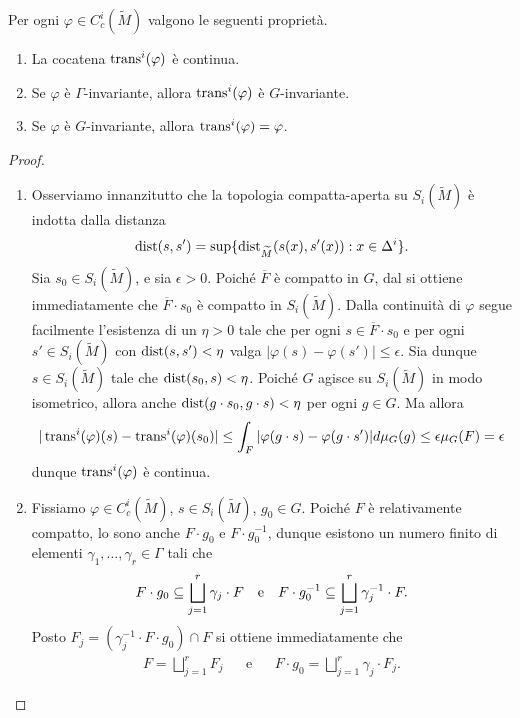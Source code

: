 \begin{proposition}
Per ogni $\varphi\in C^i_c(\widetilde M)$ valgono le seguenti proprietà.
\begin{enumerate}
\item La cocatena $\operatorname{trans}^i(\varphi)$ è continua.
\item Se $\varphi$ è $\Gamma$-invariante, allora $\operatorname{trans}^i(\varphi)$ è $G$-invariante.
\item Se $\varphi$ è $G$-invariante, allora $\operatorname{trans}^i(\varphi)=\varphi$.
\end{enumerate}
\end{proposition}
\begin{proof}\leavevmode
\begin{enumerate}
\item Osserviamo innanzitutto che la topologia compatta-aperta su $S_i(\widetilde M)$ è indotta dalla distanza
\[
\operatorname{dist}(s,s')=\sup\{\operatorname{dist}_{\widetilde M}(s(x),s'(x)):x\in\Delta^i\}.
\]
Sia $s_0\in S_i(\widetilde M)$, e sia $\epsilon>0$. Poiché $\overline{F}$ è compatto in $G$, dal  si ottiene immediatamente che $\overline{F}\cdot s_0$ è compatto in $S_i(\widetilde M)$. Dalla continuità di $\varphi$ segue facilmente l'esistenza di un $\eta>0$ tale che per ogni $s\in\overline{F}\cdot s_0$ e per ogni $s'\in S_i(\widetilde M)$ con $\operatorname{dist}(s,s')<\eta$ valga $|\varphi(s)-\varphi(s')|\le\epsilon$. Sia dunque $s\in S_i(\widetilde M)$ tale che $\operatorname{dist}(s_0,s)<\eta$. Poiché $G$ agisce su $S_i(\widetilde M)$ in modo isometrico, allora anche $\operatorname{dist}(g\cdot s_0,g\cdot s)<\eta$ per ogni $g\in G$. Ma allora
\[
|\operatorname{trans}^i(\varphi)(s)-\operatorname{trans}^i(\varphi)(s_0)|\le\int_F|\varphi(g\cdot s)-\varphi(g\cdot s')|d\mu_G(g)\le\epsilon\mu_G(F)=\epsilon
\]
dunque $\operatorname{trans}^i(\varphi)$ è continua.
\item Fissiamo $\varphi\in C^i_c(\widetilde M)$, $s\in S_i(\widetilde M)$, $g_0\in G$. Poiché $F$ è relativamente compatto, lo sono anche $F\cdot g_0$ e $F\cdot g_0^{-1}$, dunque esistono un numero finito di elementi $\gamma_1,\ldots,\gamma_r\in\Gamma$ tali che
\begin{align*}
F\cdot g_0\subseteq\bigsqcup_{j=1}^r\gamma_j\cdot F&&\text{e}&&F\cdot g_0^{-1}\subseteq\bigsqcup_{j=1}^r\gamma_j^{-1}\cdot F.
\end{align*}
Posto $F_j=(\gamma_j^{-1}\cdot F\cdot g_0)\cap F$ si ottiene immediatamente che
\begin{align*}
F=\bigsqcup_{j=1}^rF_j&&\text{e}&&F\cdot g_0=\bigsqcup_{j=1}^r\gamma_j\cdot F_j.
\end{align*}

\end{enumerate}
\end{proof}
